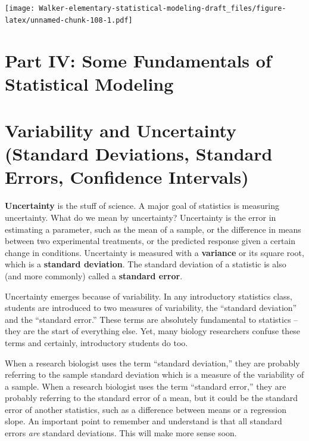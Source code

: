 \documentclass[]{book}
\begin{document}
\texttt{[image: Walker-elementary-statistical-modeling-draft\_files/figure-latex/unnamed-chunk-108-1.pdf]}

\hypertarget{part-iv-some-fundamentals-of-statistical-modeling}{%
\chapter*{Part IV: Some Fundamentals of Statistical Modeling}\label{part-iv-some-fundamentals-of-statistical-modeling}}

\hypertarget{variability-and-uncertainty-standard-deviations-standard-errors-confidence-intervals}{%
\chapter{Variability and Uncertainty (Standard Deviations, Standard Errors, Confidence Intervals)}\label{variability-and-uncertainty-standard-deviations-standard-errors-confidence-intervals}}

\textbf{Uncertainty} is the stuff of science. A major goal of statistics is measuring uncertainty. What do we mean by uncertainty? Uncertainty is the error in estimating a parameter, such as the mean of a sample, or the difference in means between two experimental treatments, or the predicted response given a certain change in conditions. Uncertainty is measured with a \textbf{variance} or its square root, which is a \textbf{standard deviation}. The standard deviation of a statistic is also (and more commonly) called a \textbf{standard error}.

Uncertainty emerges because of variability. In any introductory statistics class, students are introduced to two measures of variability, the ``standard deviation'' and the ``standard error.'' These terms are absolutely fundamental to statistics -- they are the start of everything else. Yet, many biology researchers confuse these terms and certainly, introductory students do too.

When a research biologist uses the term ``standard deviation,'' they are probably referring to the sample standard deviation which is a measure of the variability of a sample. When a research biologist uses the term ``standard error,'' they are probably referring to the standard error of a mean, but it could be the standard error of another statistics, such as a difference between means or a regression slope. An important point to remember and understand is that all standard errors \emph{are} standard deviations. This will make more sense soon.
\end{document}
